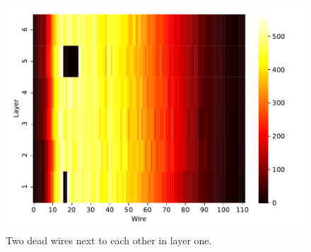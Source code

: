 \begin{figure}
  \includegraphics[width=\textwidth]{../figures/two_wires}
  \caption{Two dead wires next to each other in layer one.}
  \label{fig:two-wires}
\end{figure}
